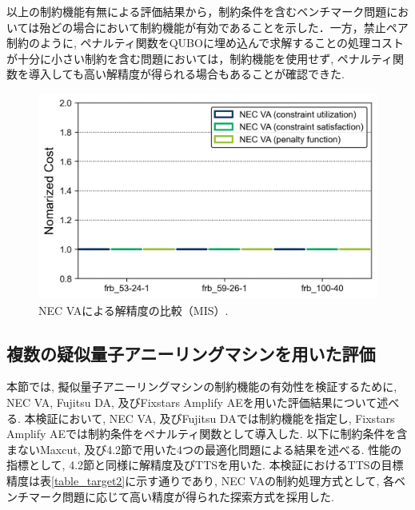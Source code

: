 \documentclass[submit,techrep,noauthor]{ipsj}
\begin{document}
以上の制約機能有無による評価結果から，制約条件を含むベンチマーク問題においては殆どの場合において制約機能が有効であることを示した．一方，禁止ペア制約のように, ペナルティ関数をQUBOに埋め込んで求解することの処理コストが十分に小さい制約を含む問題においては，制約機能を使用せず, ペナルティ関数を導入しても高い解精度が得られる場合もあることが確認できた.

\begin{figure}[tb]
\centering
\includegraphics[bb=0 0 700 230, width=15cm]{Cost_MIS_VA.png}
\caption{NEC VAによる解精度の比較（MIS）.}
\label{Cost_MIS_VA}
\end{figure}


\subsection{複数の疑似量子アニーリングマシンを用いた評価}
本節では, 擬似量子アニーリングマシンの制約機能の有効性を検証するために, NEC VA, Fujitsu DA, 及びFixstars Amplify AEを用いた評価結果について述べる. 本検証において, NEC VA, 及びFujitsu DAでは制約機能を指定し, Fixstars Amplify AEでは制約条件をペナルティ関数として導入した. 以下に制約条件を含まないMaxcut, 及び4.2節で用いた4つの最適化問題による結果を述べる. 性能の指標として, 4.2節と同様に解精度及びTTSを用いた. 本検証におけるTTSの目標精度は表\ref{table_target2}に示す通りであり, NEC VAの制約処理方式として, 各ベンチマーク問題に応じて高い精度が得られた探索方式を採用した.
\end{document}
